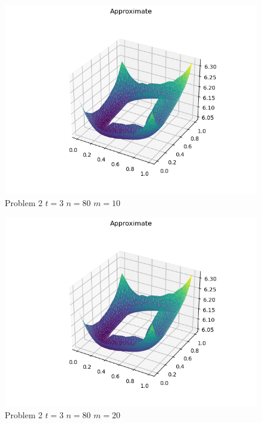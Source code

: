 \documentclass{report}
\begin{document}
\begin{figure}[h]
	\caption{Problem 2 $t = 3$ $n = 80$ $m = 10$}
	\includegraphics[width=\textwidth]{example.png}
\end{figure}
\begin{figure}[h]
	\caption{Problem 2 $t = 3$ $n = 80$ $m = 20$}
	\includegraphics[width=\textwidth]{example.png}
\end{figure}
\end{document}
